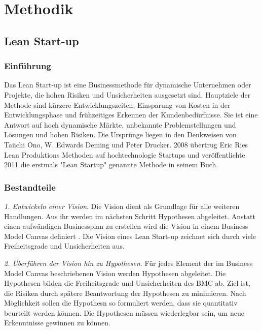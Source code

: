 \chapter{Methodik}

\section{Lean Start-up}
\subsection*{Einführung}
Das Lean Start-up ist eine Businessmethode für dynamische Unternehmen oder Projekte, die hohen Risiken und Unsicherheiten ausgesetzt sind. 
Hauptziele der Methode sind kürzere Entwicklungszeiten, Einsparung von Kosten in der Entwicklungsphase und frühzeitiges Erkennen der Kundenbedürfnisse. 
Sie ist eine Antwort auf hoch dynamische Märkte, unbekannte Problemstellungen und Lösungen und hohen Risiken. Die Ursprünge liegen in den Denkweisen von Taiichi Ōno, W. Edwards Deming und Peter Drucker. 
2008 übertrug Eric Ries Lean Produktions Methoden auf hochtechnologie Startups und veröffentlichte 2011 die erstmals "Lean Startup" genannte Methode in seinem Buch. %


\subsection*{Bestandteile}

\textit{1. Entwickeln einer Vision}. Die Vision dient als Grundlage für alle weiteren Handlungen. Aus ihr werden im nächsten Schritt Hypothesen abgeleitet. Anstatt einen aufwändigen Businessplan zu erstellen wird die Vision in einem Business Model Canvas definiert \cite{Blank2013}. Die Vision eines Lean Start-up zeichnet sich durch viele Freiheitsgrade und Unsicherheiten aus. 

\textit{2. Überführen der Vision hin zu Hypothesen}. Für jedes Element der im Business Model Canvas beschriebenen Vision werden Hypothesen abgeleitet. Die Hypothesen bilden die Freiheitsgrade und Unsicherheiten des BMC ab. Ziel ist, die Risiken durch spätere Beantwortung der Hypothesen zu minimieren. Nach Möglichkeit sollen die Hypothesn so formuliert werden, dass sie quantitativ beurteilt werden können. Die Hypothesen müssen wiederlegbar sein, um neue Erkenntnisse gewinnen zu können. 

